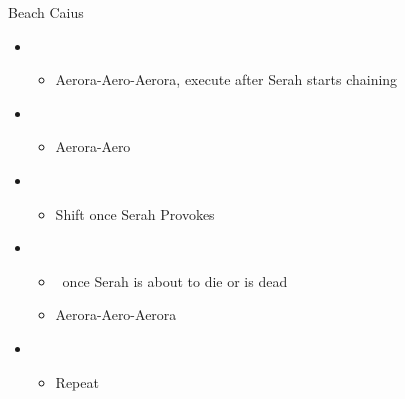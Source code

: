 \begin{battle}{Beach Caius}
	\begin{flushleft}
		\begin{itemize}
			\item \sixth
			      \begin{itemize}
				      \item Aerora-Aero-Aerora, execute after Serah starts chaining
			      \end{itemize}
			\item \fifth
			      \begin{itemize}
				      \item Aerora-Aero
			      \end{itemize}
			\item \fourth
			      \begin{itemize}
				      \item Shift once Serah Provokes
			      \end{itemize}
			\item \fifth
			      \begin{itemize}
				      \item \stagger\ once Serah is about to die or is dead
				      \item Aerora-Aero-Aerora
			      \end{itemize}
			\item \sixth
			      \begin{itemize}
				      \item Repeat
			      \end{itemize}
		\end{itemize}
	\end{flushleft}
\end{battle}

